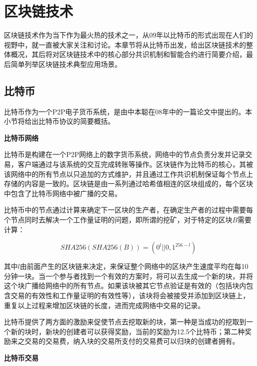 
\chapter{区块链技术}

区块链技术作为当下作为最火热的技术之一，从09年以比特币的形式出现在人们的视野中，就一直被大家关注和讨论。本章节将从比特币出发，给出区块链技术的整体概况，其后将对区块链技术中的核心部分共识机制和智能合约进行简要介绍，最后简单列举区块链技术典型应用场景。

\section{比特币}


比特币作为一个P2P电子货币系统，是由中本聪在08年中的一篇论文中提出\supercite{nakamoto2008bitcoin}的。本小节将给出比特币协议的简要概括。



\noindent\textbf{比特币网络}

比特币是构建在一个P2P网络上的数字货币系统，网络中的节点负责分发并记录交易，客户端通过与该系统的交互完成转账等操作。区块链作为比特币的核心，其被该网络中的所有节点以只追加的方式维护，并且通过工作共识机制保证每个节点上存储的内容是一致的。区块链是由一系列通过哈希值相连的区块组成的，每个区块中包含了比特币网络中被广播的交易。

比特币中的节点通过计算来确定下一区块的生产者，在确定生产者的过程中需要每个节点同时去解决一个工作量证明的问题，即所谓的挖矿，对于特定的区块$B$需要计算：

\begin{equation}\label{eqGenCmpPk}
SHA256(SHA256(B)) = (0^l||{0,1}^{256-l})
\end{equation}

其中$l$由前面产生的区块链来决定，来保证整个网络中的区块产生速度平均在每10分钟一块。当一个参与者找到一个有效的方案时，将可以去生成一个新的块，并将这个块广播给网络中的所有节点。如果该块被其它节点验证是有效的（包括块内包含交易的有效性和工作量证明的有效性等），该块将会被接受并添加到区块链上，重复以上过程来增加区块链的长度，进而完成网络中交易的记录。

比特币提供了两方面的激励来促使节点去挖取新的块，第一种是当成功的挖取到一个新的块时，新块的创建者可以获得奖励，当前的奖励为12.5个比特币；第二种奖励来之交易的交易费，纳入块的交易所支付的交易费可以归块的创建者拥有。


\noindent\textbf{比特币交易}

